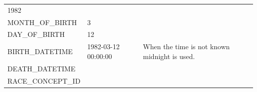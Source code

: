 \documentclass[11pt]{book}
\begin{document}
\begin{longtable}[]{@{}lll@{}}
\begin{minipage}[t]{0.16\columnwidth}
1982\strut
\end{minipage} & \begin{minipage}[t]{0.42\columnwidth}\raggedright\strut
\strut
\end{minipage}\tabularnewline
\begin{minipage}[t]{0.33\columnwidth}\raggedright\strut
MONTH\_OF\_BIRTH\strut
\end{minipage} & \begin{minipage}[t]{0.16\columnwidth}\raggedright\strut
3\strut
\end{minipage} & \begin{minipage}[t]{0.42\columnwidth}\raggedright\strut
\strut
\end{minipage}\tabularnewline
\begin{minipage}[t]{0.33\columnwidth}\raggedright\strut
DAY\_OF\_BIRTH\strut
\end{minipage} & \begin{minipage}[t]{0.16\columnwidth}\raggedright\strut
12\strut
\end{minipage} & \begin{minipage}[t]{0.42\columnwidth}\raggedright\strut
\strut
\end{minipage}\tabularnewline
\begin{minipage}[t]{0.33\columnwidth}\raggedright\strut
BIRTH\_DATETIME\strut
\end{minipage} & \begin{minipage}[t]{0.16\columnwidth}\raggedright\strut
1982-03-12 00:00:00\strut
\end{minipage} & \begin{minipage}[t]{0.42\columnwidth}\raggedright\strut
When the time is not known midnight is used.\strut
\end{minipage}\tabularnewline
\begin{minipage}[t]{0.33\columnwidth}\raggedright\strut
DEATH\_DATETIME\strut
\end{minipage} & \begin{minipage}[t]{0.16\columnwidth}\raggedright\strut
\strut
\end{minipage} & \begin{minipage}[t]{0.42\columnwidth}\raggedright\strut
\strut
\end{minipage}\tabularnewline
\begin{minipage}[t]{0.33\columnwidth}\raggedright\strut
RACE\_CONCEPT\_ID\strut
\end{minipage} & \begin{minipage}[t]{0.16\columnwidth}\raggedright\strut

\end{minipage}
\end{longtable}
\end{document}

